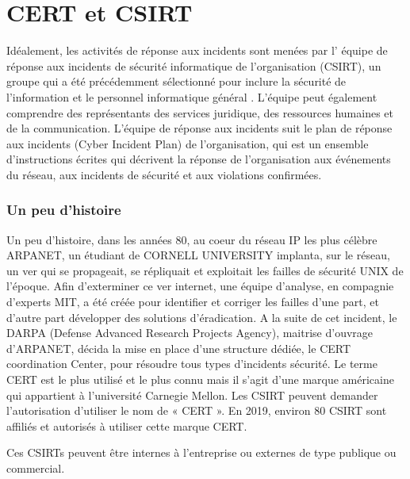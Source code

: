 %
%

\section{CERT et CSIRT}

Idéalement, les activités de réponse aux incidents sont menées par l' équipe de réponse aux incidents de sécurité informatique de l'organisation (CSIRT), un groupe qui a été précédemment sélectionné pour inclure la sécurité de l'information et le personnel informatique général . L'équipe peut également comprendre des représentants des services juridique, des ressources humaines et de la communication. L'équipe de réponse aux incidents suit le plan de réponse aux incidents (Cyber Incident Plan) de l'organisation, qui est un ensemble d'instructions écrites qui décrivent la réponse de l'organisation aux événements du réseau, aux incidents de sécurité et aux violations confirmées.

\subsubsection{Un peu d'histoire}
Un peu d'histoire, dans les années 80, au coeur du réseau IP les plus célèbre ARPANET, un étudiant de CORNELL UNIVERSITY implanta, sur le réseau, un ver  qui se propageait, se répliquait et exploitait les failles de sécurité UNIX de l’époque. Afin d’exterminer ce ver internet, une équipe d’analyse, en compagnie d’experts MIT, a été créée pour identifier et corriger les failles d’une part, et d’autre part développer des solutions d’éradication. A la suite de cet incident, le DARPA (Defense Advanced Research Projects Agency), maitrise d’ouvrage d’ARPANET, décida la mise en place d’une structure dédiée, le CERT coordination Center, pour résoudre tous types d’incidents sécurité. Le terme CERT est le plus utilisé et le plus connu mais il s’agit d’une marque américaine qui appartient à l’université Carnegie Mellon. Les CSIRT peuvent demander l’autorisation d’utiliser le nom de « CERT ». En 2019, environ 80 CSIRT sont affiliés et autorisés à utiliser cette marque CERT.

Ces CSIRTs peuvent être internes à l'entreprise ou externes de type publique ou commercial.

